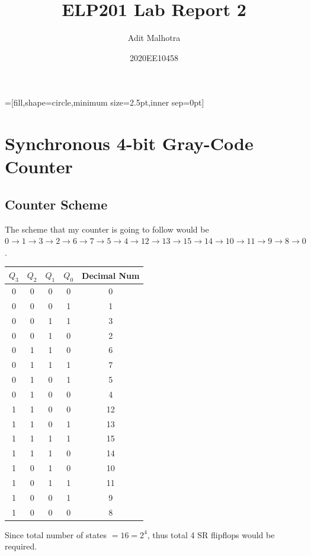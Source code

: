 \documentclass[a4paper]{article}
\title{ELP201 Lab Report 2}
\author{Adit Malhotra}
\date{2020EE10458}
\begin{document}
\maketitle
{}=[fill,shape=circle,minimum size=2.5pt,inner sep=0pt]
\section{Synchronous 4-bit Gray-Code Counter}
\subsection{Counter Scheme}
The scheme that my counter is going to follow would be $0\rightarrow1\rightarrow3\rightarrow2\rightarrow6\rightarrow7\rightarrow5\rightarrow4\rightarrow12\rightarrow13\rightarrow15\rightarrow14\rightarrow10\rightarrow11\rightarrow9\rightarrow8\rightarrow0$.
\begin{center}
	\begin{tabular}{||c c c c c||}
		\hline
		$Q_{3}$ & $Q_{2}$ & $Q_{1}$ & $Q_{0}$ & Decimal Num \\ [0.5ex]
		\hline
		\hline
		0       & 0       & 0       & 0       & 0           \\ \hline
		0       & 0       & 0       & 1       & 1           \\ \hline
		0       & 0       & 1       & 1       & 3           \\ \hline
		0       & 0       & 1       & 0       & 2           \\ \hline
		0       & 1       & 1       & 0       & 6           \\ \hline
		0       & 1       & 1       & 1       & 7           \\ \hline
		0       & 1       & 0       & 1       & 5           \\ \hline
		0       & 1       & 0       & 0       & 4           \\ \hline
		1       & 1       & 0       & 0       & 12          \\ \hline
		1       & 1       & 0       & 1       & 13          \\ \hline
		1       & 1       & 1       & 1       & 15          \\ \hline
		1       & 1       & 1       & 0       & 14          \\ \hline
		1       & 0       & 1       & 0       & 10          \\ \hline
		1       & 0       & 1       & 1       & 11          \\ \hline
		1       & 0       & 0       & 1       & 9           \\ \hline
		1       & 0       & 0       & 0       & 8           \\ [1ex]
		\hline
	\end{tabular}
\end{center}
Since total number of states $=16 = 2^{4}$, thus total 4 SR flipflops would be required.
\end{document}
